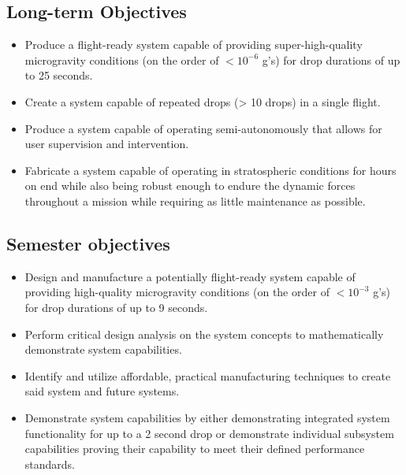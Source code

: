 \subsection*{Long-term Objectives}

\begin{itemize}
    \item Produce a flight-ready system capable of providing super-high-quality microgravity conditions (on the order of $< 10^{-6}$ g's) for drop durations of up to 25 seconds.
    \item Create a system capable of repeated drops (> 10 drops) in a single flight.
    \item Produce a system capable of operating semi-autonomously that allows for user supervision and intervention. 
    \item Fabricate a system capable of operating in stratospheric conditions for hours on end while also being robust enough to endure the dynamic forces throughout a mission while requiring as little maintenance as possible.
\end{itemize}

\subsection*{Semester objectives}

\begin{itemize}
    \item Design and manufacture a potentially flight-ready system capable of providing high-quality microgravity conditions (on the order of $< 10^{-3}$ g's) for drop durations of up to 9 seconds.
    \item Perform critical design analysis on the system concepts to mathematically demonstrate system capabilities.
    \item Identify and utilize affordable, practical manufacturing techniques to create said system and future systems. 
    \item Demonstrate system capabilities by either demonstrating integrated system functionality for up to a 2 second drop or demonstrate individual subsystem capabilities proving their capability to meet their defined performance standards. 
\end{itemize}




